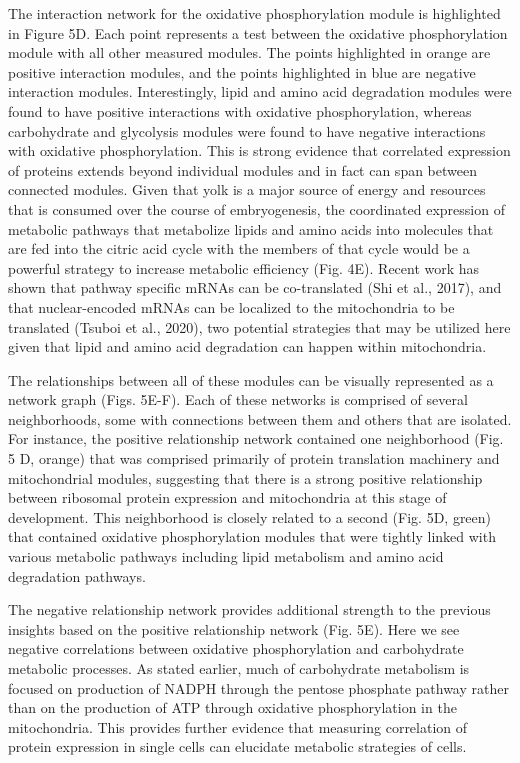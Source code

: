 The interaction network for the oxidative phosphorylation module is highlighted in Figure 5D. Each point represents a test between the oxidative phosphorylation module with all other measured modules. The points highlighted in orange are positive interaction modules, and the points highlighted in blue are negative interaction modules. Interestingly, lipid and amino acid degradation modules were found to have positive interactions with oxidative phosphorylation, whereas carbohydrate and glycolysis modules were found to have negative interactions with oxidative phosphorylation. This is strong evidence that correlated expression of proteins extends beyond individual modules and in fact can span between connected modules. Given that yolk is a major source of energy and resources that is consumed over the course of embryogenesis, the coordinated expression of metabolic pathways that metabolize lipids and amino acids into molecules that are fed into the citric acid cycle with the members of that cycle would be a powerful strategy to increase metabolic efficiency (Fig. 4E). Recent work has shown that pathway specific mRNAs can be co-translated (Shi et al., 2017), and that nuclear-encoded mRNAs can be localized to the mitochondria to be translated (Tsuboi et al., 2020), two potential strategies that may be utilized here given that lipid and amino acid degradation can happen within mitochondria.

The relationships between all of these modules can be visually represented as a network graph (Figs. 5E-F). Each of these networks is comprised of several neighborhoods, some with connections between them and others that are isolated. For instance, the positive relationship network contained one neighborhood (Fig. 5 D, orange) that was comprised primarily of protein translation machinery and mitochondrial modules, suggesting that there is a strong positive relationship between ribosomal protein expression and mitochondria at this stage of development. This neighborhood is closely related to a second (Fig. 5D, green) that contained oxidative phosphorylation modules that were tightly linked with various metabolic pathways including lipid metabolism and amino acid degradation pathways.  

The negative relationship network provides additional strength to the previous insights based on the positive relationship network (Fig. 5E). Here we see negative correlations between oxidative phosphorylation and carbohydrate metabolic processes. As stated earlier, much of carbohydrate metabolism is focused on production of NADPH through the pentose phosphate pathway rather than on the production of ATP through oxidative phosphorylation in the mitochondria. This provides further evidence that measuring correlation of protein expression in single cells can elucidate metabolic strategies of cells.

